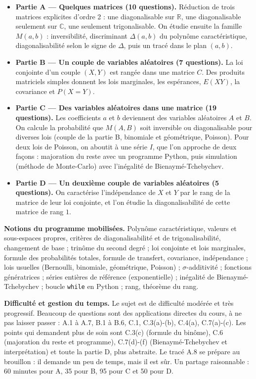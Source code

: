 \documentclass[11pt,a4paper]{article}
\providecommand{\tightlist}{\setlength{\itemsep}{0pt}\setlength{\parskip}{0pt}}
\begin{document}
\begin{itemize}
\tightlist
\item
  \textbf{Partie A --- Quelques matrices (10 questions).} Réduction de trois matrices explicites d'ordre 2 : une diagonalisable sur \(\mathbb{R}\), une diagonalisable seulement sur \(\mathbb{C}\), une seulement trigonalisable. On étudie ensuite la famille \(M(a,b)\) : inversibilité, discriminant \(\Delta(a,b)\) du polynôme caractéristique, diagonalisabilité selon le signe de \(\Delta\), puis un tracé dans le plan \((a,b)\).
\item
  \textbf{Partie B --- Un couple de variables aléatoires (7 questions).} La loi conjointe d'un couple \((X,Y)\) est rangée dans une matrice \(C\). Des produits matriciels simples donnent les lois marginales, les espérances, \(E(XY)\), la covariance et \(P(X=Y)\).
\item
  \textbf{Partie C --- Des variables aléatoires dans une matrice (19 questions).} Les coefficients \(a\) et \(b\) deviennent des variables aléatoires \(A\) et \(B\). On calcule la probabilité que \(M(A,B)\) soit inversible ou diagonalisable pour diverses lois (couple de la partie B, binomiale et géométrique, Poisson). Pour deux lois de Poisson, on aboutit à une série \(I\), que l'on approche de deux façons : majoration du reste avec un programme Python, puis simulation (méthode de Monte-Carlo) avec l'inégalité de Bienaymé-Tchebychev.
\item
  \textbf{Partie D --- Un deuxième couple de variables aléatoires (5 questions).} On caractérise l'indépendance de \(X\) et \(Y\) par le rang de la matrice de leur loi conjointe, et l'on étudie la diagonalisabilité de cette matrice de rang \(1\).
\end{itemize}

\textbf{Notions du programme mobilisées.} Polynôme caractéristique, valeurs et sous-espaces propres, critères de diagonalisabilité et de trigonalisabilité, changement de base ; trinôme du second degré ; loi conjointe et lois marginales, formule des probabilités totales, formule de transfert, covariance, indépendance ; lois usuelles (Bernoulli, binomiale, géométrique, Poisson) ; \(\sigma\)-additivité ; fonctions génératrices ; séries entières de référence (exponentielle) ; inégalité de Bienaymé-Tchebychev ; boucle \texttt{while} en Python ; rang, théorème du rang.

\textbf{Difficulté et gestion du temps.} Le sujet est de difficulté modérée et très progressif. Beaucoup de questions sont des applications directes du cours, à ne pas laisser passer : A.1 à A.7, B.1 à B.6, C.1, C.3(a)-(b), C.4(a), C.7(a)-(c). Les points qui demandent plus de soin sont C.3(c) (formule du binôme), C.6 (majoration du reste et programme), C.7(d)-(f) (Bienaymé-Tchebychev et interprétation) et toute la partie D, plus abstraite. Le tracé A.8 se prépare au brouillon : il demande un peu de temps, mais il est sûr. Un partage raisonnable : 60 minutes pour A, 35 pour B, 95 pour C et 50 pour D.
\end{document}
